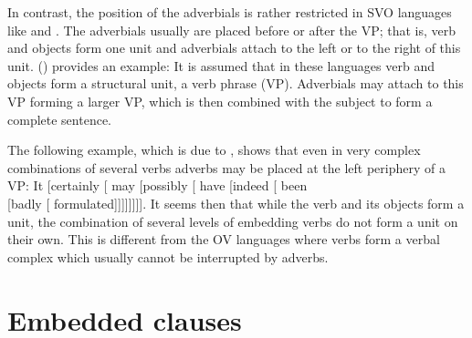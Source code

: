\noindent
In contrast, the position of the adverbials is rather restricted in SVO languages like  and
. The adverbials usually are placed before or after the VP; that is, verb and objects form one
unit and adverbials attach to the left or to the right of this unit. () provides an example:
\eal
{}
\zl
It is assumed that in these languages verb and objects form a structural unit, a verb phrase (VP). Adverbials may
attach to this VP forming a larger VP, which is then combined with the subject to form a complete sentence.

The following example, which is due to \citet[§ 8.20, 495]{QGLS85a-u}, shows that even in very
complex combinations of several verbs adverbs may be placed at the left periphery of a VP:
\ea
It [certainly [ may [possibly [ have [indeed [ been\\ {}[badly [ formulated]]]]]]]].
\z
It seems then that while the verb and its objects form a unit, the combination of several levels of embedding verbs do not form a unit on their own. 
This is different from the OV languages where verbs form a verbal complex which usually cannot be
interrupted by adverbs.
\eal
{}
\zl
{} 

\section{Embedded clauses}
\label{sec-embeeded-clauses}


